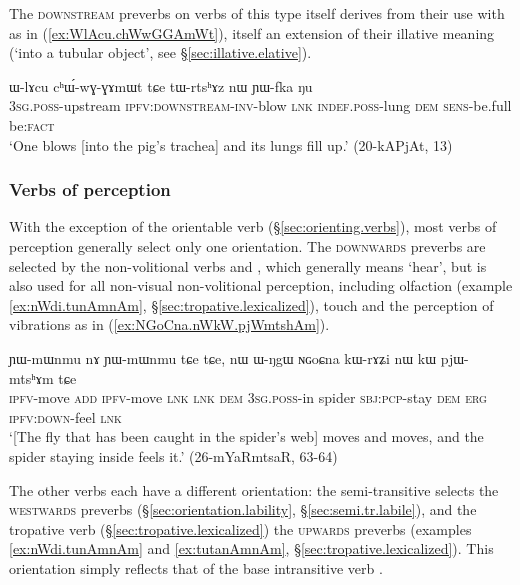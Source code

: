 The \textsc{downstream} preverbs on verbs of this type itself derives from their use with  as in (\ref{ex:WlAcu.chWwGGAmWt}), itself an extension of their illative meaning (`into a tubular object', see §\ref{sec:illative.elative}).

\begin{exe}
\ex \label{ex:WlAcu.chWwGGAmWt}
\gll  ɯ-lɤcu cʰɯ́-wɣ-ɣɤmɯt tɕe tɯ-rtsʰɤz nɯ ɲɯ-fka ŋu \\
\textsc{3sg}.\textsc{poss}-upstream \textsc{ipfv}:\textsc{downstream}-\textsc{inv}-blow \textsc{lnk} \textsc{indef}.\textsc{poss}-lung \textsc{dem} \textsc{sens}-be.full be:\textsc{fact} \\
\glt  `One blows [into the pig's trachea] and its lungs fill up.' (20-kAPjAt, 13)
\end{exe}

\subsubsection{Verbs of perception}  \label{sec:preverb.perception} 
With the exception of the orientable verb  (§\ref{sec:orienting.verbs}), most verbs of perception generally select only one orientation. The  \textsc{downwards} preverbs are selected by the non-volitional  verbs  and , which generally means `hear', but is also used for all non-visual  non-volitional perception, including olfaction (example \ref{ex:nWdi.tunAmnAm}, §\ref{sec:tropative.lexicalized}), touch and the perception of vibrations as in  (\ref{ex:NGoCna.nWkW.pjWmtshAm}).
 
\begin{exe}
\ex \label{ex:NGoCna.nWkW.pjWmtshAm}
\gll ɲɯ-mɯnmu nɤ ɲɯ-mɯnmu tɕe tɕe, nɯ ɯ-ŋgɯ ɴɢoɕna kɯ-rɤʑi nɯ kɯ pjɯ-mtsʰɤm tɕe  \\
\textsc{ipfv}-move \textsc{add} \textsc{ipfv}-move  \textsc{lnk} \textsc{lnk} \textsc{dem} \textsc{3sg}.\textsc{poss}-in spider \textsc{sbj}:\textsc{pcp}-stay \textsc{dem} \textsc{erg} \textsc{ipfv}:\textsc{down}-feel \textsc{lnk} \\
\glt `[The fly that has been caught in the spider's web] moves and moves, and the spider staying inside feels it.' (26-mYaRmtsaR, 63-64)
\end{exe}

The other verbs each have a different orientation: the semi-transitive  selects the \textsc{westwards} preverbs (§\ref{sec:orientation.lability}, §\ref{sec:semi.tr.labile}), and the tropative verb  (§\ref{sec:tropative.lexicalized}) the \textsc{upwards} preverbs (examples \ref{ex:nWdi.tunAmnAm} and \ref{ex:tutanAmnAm}, §\ref{sec:tropative.lexicalized}). This orientation simply reflects that of the base intransitive verb .

